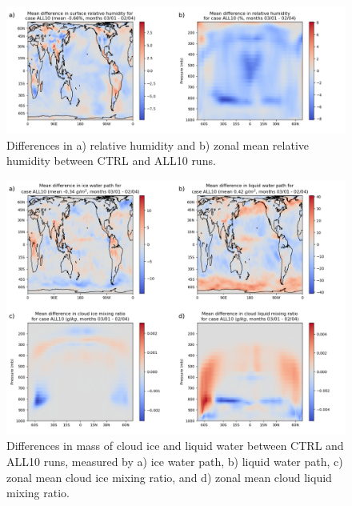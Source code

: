 \documentclass [11pt, proquest] {uwthesis}[2020/02/24]
\begin{document}
\begin{figure}
    \centering
    \includegraphics[width=5.5in]{Figure2.png}
    \caption{Differences in a) relative humidity and b) zonal mean relative humidity between CTRL and ALL10 runs.}
    \label{fig:all10-relhum-map}
\end{figure}

\begin{figure}
    \centering
    \includegraphics[width=5.5in]{Figure3.png}
    \caption{Differences in mass of cloud ice and liquid water between CTRL and ALL10 runs, measured by a) ice water path, b) liquid water path, c) zonal mean cloud ice mixing ratio, and d) zonal mean cloud liquid mixing ratio.}
    \label{fig:all10-wp-map}
\end{figure}
\end{document}
